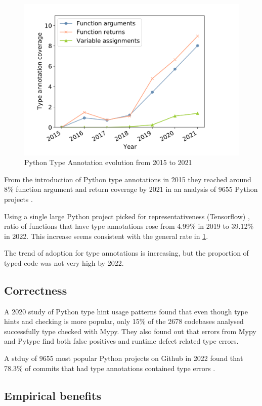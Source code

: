 \begin{figure}
    \centering
    \includegraphics[width=0.5\linewidth]{Screenshot 2024-12-05 at 15.37.59.png}
    \caption{Python Type Annotation evolution from 2015 to 2021 \cite{di_grazia_evolution_2022}}
    \label{fig:annotation-evolution}
\end{figure}
From the introduction of Python type annotations in 2015 they reached around 8\% function argument and return coverage by 2021 in an analysis of 9655 Python projects \cite{di_grazia_evolution_2022}. 

Using a single large Python project picked for representativeness (Tensorflow) \cite{lin_towards_large_scale_2023}, ratio of functions that have type annotations rose from 4.99\% in 2019 to 39.12\% in 2022. This increase seems consistent with the general rate in \ref{fig:annotation-evolution}.

The trend of adoption for type annotations is increasing, but the proportion of typed code was not very high by 2022.

\subsection{Correctness}

A 2020 study of Python type hint usage patterns \cite{rak-amnouykit_taleoftwo_2020} found that even though type hints and checking is more popular, only 15\% of the 2678 codebases analysed successfully type checked with Mypy. They also found out that errors from Mypy and Pytype find both false positives and runtime defect related type errors.

A stduy of 9655 most popular Python projects on Github in 2022 found that 78.3\% of commits that had type annotations contained type errors \cite{di_grazia_evolution_2022}.

\subsection{Empirical benefits}

